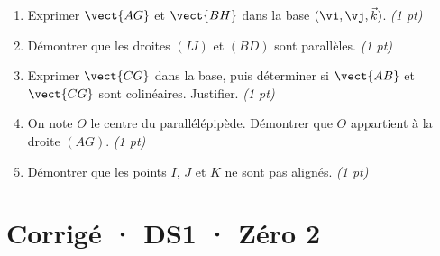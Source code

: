 \begin{enumerate}

\item Exprimer $\vect{AG}$ et $\vect{BH}$ dans la base $(\vi,\vj,\vec k)$. \hfill\textit{(1 pt)}

\item Démontrer que les droites $(IJ)$ et $(BD)$ sont parallèles. \hfill\textit{(1 pt)}

\item Exprimer $\vect{CG}$ dans la base, puis déterminer si $\vect{AB}$ et $\vect{CG}$ sont colinéaires. Justifier. \hfill\textit{(1 pt)}

\item On note $O$ le centre du parallélépipède. Démontrer que $O$ appartient à la droite $(AG)$. \hfill\textit{(1 pt)}

\item Démontrer que les points $I$, $J$ et $K$ ne sont pas alignés. \hfill\textit{(1 pt)}

\end{enumerate}

\ifprof\clearpage

\section*{Corrigé · DS1 · Zéro 2}\label{cor:1-2}

